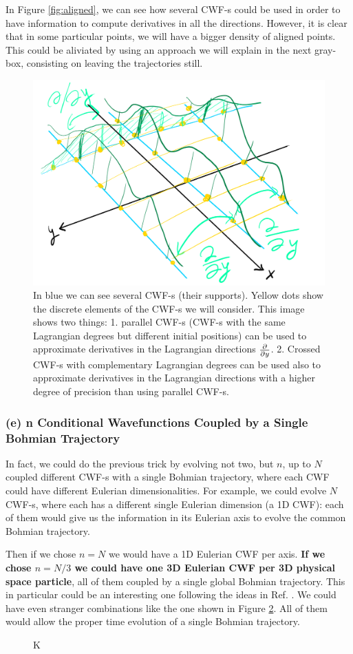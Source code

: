 \documentclass[11pt, a4paper]{article} %
\begin{document}
In Figure \ref{fig:aligned}, we can see how several CWF-s could be used in order to have information to compute derivatives in all the directions. However, it is clear that in some particular points, we will have a bigger density of aligned points. This could be aliviated by using an approach we will explain in the next gray-box, consisting on leaving the trajectories still.


\begin{figure}[h!]
  \centering
    \includegraphics[width=0.65\linewidth]{aligned_original.png}
  \caption{In blue we can see several CWF-s (their supports). Yellow dots show the discrete elements of the CWF-s we will consider. This image shows two things: 1. parallel CWF-s (CWF-s with the same Lagrangian degrees but different initial positions) can be used to approximate derivatives in the Lagrangian directions $\pdv{}{y}$. 2. Crossed CWF-s with complementary Lagrangian degrees can be used also to approximate derivatives in the Lagrangian directions with a higher degree of precision than using parallel CWF-s.  }
  \label{fig:aligned2}
\end{figure}

\subsubsection*{(e) n Conditional Wavefunctions Coupled by a Single Bohmian Trajectory}
In fact, we could do the previous trick by evolving not two, but $n$, up to $N$ coupled different CWF-s with a single Bohmian trajectory, where each CWF could have different Eulerian dimensionalities. For example, we could evolve $N$ CWF-s, where each has a different single Eulerian dimension (a 1D CWF): each of them would give us the information in its Eulerian axis to evolve the common Bohmian trajectory.

Then if we chose $n=N$ we would have a 1D Eulerian CWF per axis. {\bf If we chose $n=N/3$ we could have one 3D Eulerian CWF per 3D physical space particle}, all of them coupled by a single global Bohmian trajectory. This in particular could be an interesting one following the ideas in Ref. \cite{physicalOriols}. We could have even stranger combinations like the one shown in Figure \ref{fig:strangeSlicing}. All of them would allow the proper time evolution of a single Bohmian trajectory.
\begin{figure}[h!]
  \centering
  \caption{K }
  \label{fig:strangeSlicing}
\end{figure}
\end{document}
